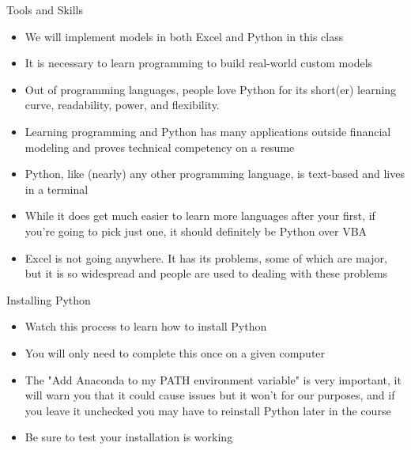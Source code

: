 \documentclass[]{article}
\begin{document}
\begin{section}{Tools and Skills}
\begin{itemize}
\item We will implement models in both Excel and Python in this class
\item It is necessary to learn programming to build real-world custom models
\item Out of programming languages, people love Python for its short(er) learning curve, readability, power, and flexibility. 
\item Learning programming and Python has many applications outside financial modeling and proves technical competency on a resume
\item Python, like (nearly) any other programming language, is text-based and lives in a terminal
\item While it does get much easier to learn more languages after your first, if you're going to pick just one, it should definitely be Python over VBA
\item Excel is not going anywhere. It has its problems, some of which are major, but it is so widespread and people are used to dealing with these problems
\end{itemize}
\end{section}
\begin{section}{Installing Python}
\begin{itemize}
\item Watch this process to learn how to install Python
\item You will only need to complete this once on a given computer
\item The "Add Anaconda to my PATH environment variable" is very important, it will warn you that it could cause issues but it won't for our purposes, and if you leave it unchecked you may have to reinstall Python later in the course
\item Be sure to test your installation is working
\end{itemize}
\end{section}
\end{document}
